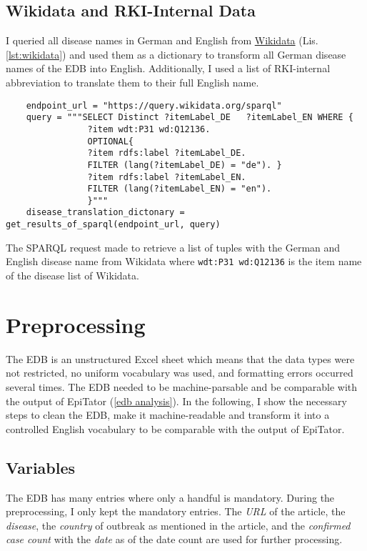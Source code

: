 \subsection{Wikidata and RKI-Internal Data}\label{wikidata}
I queried all disease names in German and English from \href{https://www.wikidata.org/wiki/Wikidata:Main_Page}{Wikidata} (Lis. \ref{lst:wikidata}) and used them as a dictionary to transform all German disease names of the EDB into English. Additionally, I used a list of RKI-internal abbreviation to translate them to their full English name.

\begin{listing}[h]
  \begin{verbatim}
    endpoint_url = "https://query.wikidata.org/sparql"
    query = """SELECT Distinct ?itemLabel_DE   ?itemLabel_EN WHERE {
                ?item wdt:P31 wd:Q12136.
                OPTIONAL{
                ?item rdfs:label ?itemLabel_DE.
                FILTER (lang(?itemLabel_DE) = "de"). }
                ?item rdfs:label ?itemLabel_EN.
                FILTER (lang(?itemLabel_EN) = "en").
                }"""
    disease_translation_dictonary = get_results_of_sparql(endpoint_url, query)
  \end{verbatim}
  \caption{The SPARQL request made to retrieve a list of tuples with the German and English disease name from Wikidata where \texttt{wdt:P31 wd:Q12136} is the item name of the disease list of Wikidata.}
  \label{lst:wikidata}
\end{listing}


\section{Preprocessing}
The EDB is an unstructured Excel sheet which means that the data types were not restricted, no uniform vocabulary was used, and formatting errors occurred several times.
The EDB needed to be machine-parsable and be comparable with the output of EpiTator (\ref{edb analysis}).
In the following, I show the necessary steps to clean the EDB, make it machine-readable and transform it into a controlled English vocabulary to be comparable with the output of EpiTator.

\subsection{Variables}
The EDB has many entries where only a handful is mandatory. During the preprocessing, I only kept the mandatory entries.
The \emph{URL} of the article, the \emph{disease}, the \emph{country} of outbreak as mentioned in the article, and the \emph{confirmed case count} with the \emph{date} as of the date count are used for further processing.

